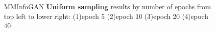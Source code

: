 \documentclass[letterpaper,12pt]{article}
\begin{document}
\begin{figure}[H]
    \hspace{10px}
    \hspace{10px}
    \caption{MMInfoGAN \textbf{Uniform sampling} results by number of epochs from top left to lower right: (1)epoch 5 (2)epoch 10 (3)epoch 20 (4)epoch 40}
\end{figure}
\end{document}

